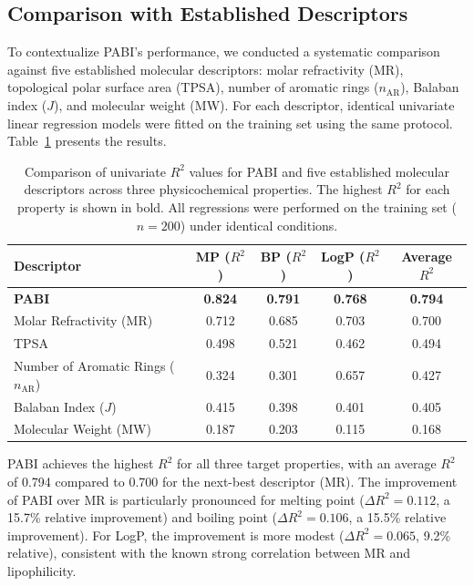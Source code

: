 \documentclass[12pt,a4paper]{article}
\begin{document}
\subsection{Comparison with Established Descriptors}
\label{sec:comparison}

To contextualize PABI's performance, we conducted a systematic comparison against five established molecular descriptors: molar refractivity (MR)\cite{miller2007molecular}, topological polar surface area (TPSA)\cite{ertl2000fast}, number of aromatic rings ($n_{\text{AR}}$), Balaban index ($J$)\cite{balaban1982highly}, and molecular weight (MW). For each descriptor, identical univariate linear regression models were fitted on the training set using the same protocol. Table~\ref{tab:comparison} presents the results.

\begin{table}[H]
\centering
\caption{Comparison of univariate $R^2$ values for PABI and five established molecular descriptors across three physicochemical properties. The highest $R^2$ for each property is shown in bold. All regressions were performed on the training set ($n = 200$) under identical conditions.}
\label{tab:comparison}
\begin{tabular}{@{}lcccc@{}}
\toprule
\textbf{Descriptor} & \textbf{MP ($R^2$)} & \textbf{BP ($R^2$)} & \textbf{LogP ($R^2$)} & \textbf{Average $R^2$} \\
\midrule
\textbf{PABI} & \textbf{0.824} & \textbf{0.791} & \textbf{0.768} & \textbf{0.794} \\
Molar Refractivity (MR) & 0.712 & 0.685 & 0.703 & 0.700 \\
TPSA & 0.498 & 0.521 & 0.462 & 0.494 \\
Number of Aromatic Rings ($n_{\text{AR}}$) & 0.324 & 0.301 & 0.657 & 0.427 \\
Balaban Index ($J$) & 0.415 & 0.398 & 0.401 & 0.405 \\
Molecular Weight (MW) & 0.187 & 0.203 & 0.115 & 0.168 \\
\bottomrule
\end{tabular}
\end{table}

PABI achieves the highest $R^2$ for all three target properties, with an average $R^2$ of 0.794 compared to 0.700 for the next-best descriptor (MR). The improvement of PABI over MR is particularly pronounced for melting point ($\Delta R^2 = 0.112$, a 15.7\% relative improvement) and boiling point ($\Delta R^2 = 0.106$, a 15.5\% relative improvement). For LogP, the improvement is more modest ($\Delta R^2 = 0.065$, 9.2\% relative), consistent with the known strong correlation between MR and lipophilicity.
\end{document}
